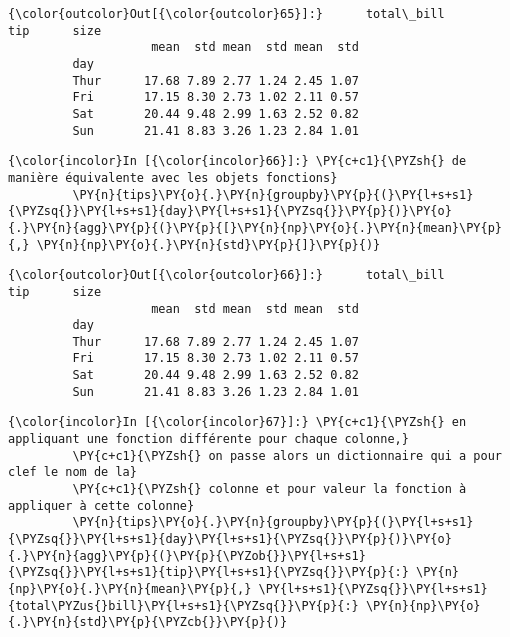 \begin{Verbatim}[commandchars=\\\{\}]
{\color{outcolor}Out[{\color{outcolor}65}]:}      total\_bill       tip      size     
                    mean  std mean  std mean  std
         day                                     
         Thur      17.68 7.89 2.77 1.24 2.45 1.07
         Fri       17.15 8.30 2.73 1.02 2.11 0.57
         Sat       20.44 9.48 2.99 1.63 2.52 0.82
         Sun       21.41 8.83 3.26 1.23 2.84 1.01
\end{Verbatim}
            
    \begin{Verbatim}[commandchars=\\\{\}]
{\color{incolor}In [{\color{incolor}66}]:} \PY{c+c1}{\PYZsh{} de manière équivalente avec les objets fonctions}
         \PY{n}{tips}\PY{o}{.}\PY{n}{groupby}\PY{p}{(}\PY{l+s+s1}{\PYZsq{}}\PY{l+s+s1}{day}\PY{l+s+s1}{\PYZsq{}}\PY{p}{)}\PY{o}{.}\PY{n}{agg}\PY{p}{(}\PY{p}{[}\PY{n}{np}\PY{o}{.}\PY{n}{mean}\PY{p}{,} \PY{n}{np}\PY{o}{.}\PY{n}{std}\PY{p}{]}\PY{p}{)}
\end{Verbatim}


\begin{Verbatim}[commandchars=\\\{\}]
{\color{outcolor}Out[{\color{outcolor}66}]:}      total\_bill       tip      size     
                    mean  std mean  std mean  std
         day                                     
         Thur      17.68 7.89 2.77 1.24 2.45 1.07
         Fri       17.15 8.30 2.73 1.02 2.11 0.57
         Sat       20.44 9.48 2.99 1.63 2.52 0.82
         Sun       21.41 8.83 3.26 1.23 2.84 1.01
\end{Verbatim}
            
    \begin{Verbatim}[commandchars=\\\{\}]
{\color{incolor}In [{\color{incolor}67}]:} \PY{c+c1}{\PYZsh{} en appliquant une fonction différente pour chaque colonne,}
         \PY{c+c1}{\PYZsh{} on passe alors un dictionnaire qui a pour clef le nom de la}
         \PY{c+c1}{\PYZsh{} colonne et pour valeur la fonction à appliquer à cette colonne}
         \PY{n}{tips}\PY{o}{.}\PY{n}{groupby}\PY{p}{(}\PY{l+s+s1}{\PYZsq{}}\PY{l+s+s1}{day}\PY{l+s+s1}{\PYZsq{}}\PY{p}{)}\PY{o}{.}\PY{n}{agg}\PY{p}{(}\PY{p}{\PYZob{}}\PY{l+s+s1}{\PYZsq{}}\PY{l+s+s1}{tip}\PY{l+s+s1}{\PYZsq{}}\PY{p}{:} \PY{n}{np}\PY{o}{.}\PY{n}{mean}\PY{p}{,} \PY{l+s+s1}{\PYZsq{}}\PY{l+s+s1}{total\PYZus{}bill}\PY{l+s+s1}{\PYZsq{}}\PY{p}{:} \PY{n}{np}\PY{o}{.}\PY{n}{std}\PY{p}{\PYZcb{}}\PY{p}{)}
\end{Verbatim}


